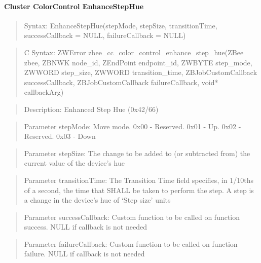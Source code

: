 \paragraph{Cluster ColorControl EnhanceStepHue}
\begin{quote}Syntax: EnhanceStepHue(stepMode, stepSize, transitionTime, successCallback = NULL, failureCallback = NULL)\end{quote}
\begin{quote}C Syntax: ZWError zbee\_cc\_color\_control\_enhance\_step\_hue(ZBee zbee, ZBNWK node\_id, ZEndPoint endpoint\_id, ZWBYTE step\_mode, ZWWORD step\_size, ZWWORD transition\_time, ZBJobCustomCallback successCallback, ZBJobCustomCallback failureCallback, void* callbackArg)\end{quote}
\begin{quote}Description: Enhanced Step Hue (0x42/66)\end{quote}
\begin{quote}Parameter stepMode: Move mode. 0x00 - Reserved. 0x01 - Up. 0x02 - Reserved. 0x03 - Down\end{quote}
\begin{quote}Parameter stepSize: The change to be added to (or subtracted from) the current value of the device’s hue\end{quote}
\begin{quote}Parameter transitionTime: The Transition Time field specifies, in 1/10ths of a second, the time that SHALL be taken to perform the step. A step is a change in the device’s hue of ‘Step size’ units\end{quote}
\begin{quote}Parameter successCallback: Custom function to be called on function success. NULL if callback is not needed\end{quote}
\begin{quote}Parameter failureCallback: Custom function to be called on function failure. NULL if callback is not needed\end{quote}


